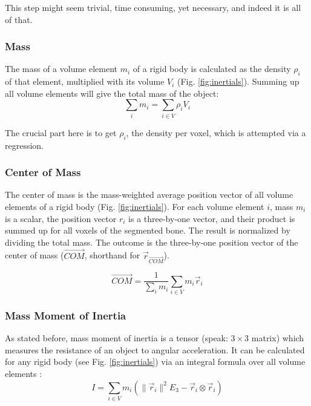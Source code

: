 This step might seem trivial, time consuming, yet necessary, and indeed it is all of that.


\subsubsection{Mass}
\label{sec:orgf732968}
The mass of a volume element \(m_{i}\) of a rigid body is calculated as the density \(\rho_{i}\) of that element, multiplied with its volume \(V_{i}\) (Fig. \ref{fig:inertials}).
Summing up all volume elements will give the total mass of the object:
\begin{equation}\label{eqn:mass}
\sum_{i} m_{i} = \sum\limits_{i \in V} \rho_{i} V_{i}
\end{equation}

The crucial part here is to get \(\rho_{i}\), the density per voxel, which is attempted via a regression.


\subsubsection{Center of Mass}
\label{sec:org5fab470}
The center of mass is the mass-weighted average position vector of all volume elements of a rigid body (Fig. \ref{fig:inertials}).
For each volume element \(i\), mass \(m_{i}\) is a scalar, the position vector \(r_{i}\) is a three-by-one vector, and their product is summed up for all voxels of the segmented bone.
The result is normalized by dividing the total mass.
The outcome is the three-by-one position vector of the center of mass (\(\vec{COM}\), shorthand for \(\vec{r}_{\vec{COM}}\)).
\begin{change}
\begin{equation}\label{eqn:com}
 \vec{COM} = \frac{1}{\sum_i m_{i}} \sum\limits_{i \in V} m_{i} \vec{r}_{i}
\end{equation}
\end{change}


\subsubsection{Mass Moment of Inertia}
\label{sec:org0f823c1}
As stated before, mass moment of inertia is a tensor (speak: \(3\times 3\) matrix) which measures the resistance of an object to angular acceleration.
It can be calculated for any rigid body (see Fig. \ref{fig:inertials}) via an integral formula over all volume elements \citep{WikipediaMOI}:
\begin{equation}\label{eqn:mmoi}
 I = \sum\limits_{i \in V} m_{i} \left( \lVert \vec{r}_{i} \rVert^{2}E_3 - \vec{r}_{i} \otimes \vec{r}_{i} \right)
\end{equation}

